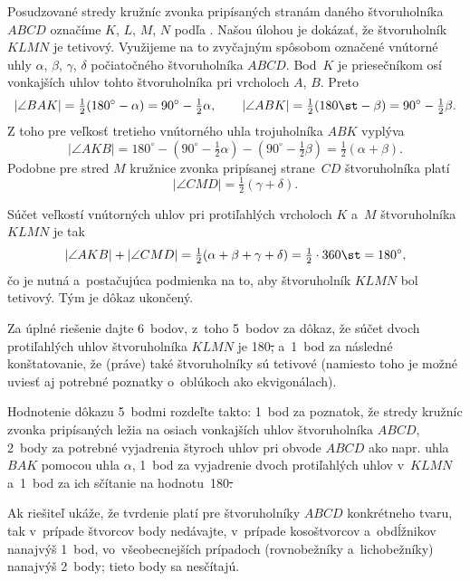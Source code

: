 {%
Posudzované stredy kružníc zvonka
%
pripísaných stranám daného štvoruholníka
$ABCD$ označíme $K$, $L$, $M$, $N$ podľa \obr. Našou úlohou je
dokázať, že štvoruholník $KLMN$ je tetivový. Využijeme na to zvyčajným spôsobom
označené vnútorné uhly $\alpha$, $\beta$, $\gamma$, $\delta$ počiatočného
štvoruholníka $ABCD$.
Bod~$K$ je priesečníkom osí vonkajších uhlov tohto štvoruholníka pri
vrcholoch $A$, $B$. Preto
$$
|\angle BAK|=\tfrac12(180^\circ-\alpha)=90^\circ-\tfrac12\alpha,\qquad
|\angle ABK|=\tfrac12(180\st-\beta)=90^\circ-\tfrac12\beta.
$$
Z toho pre veľkosť tretieho vnútorného uhla trojuholníka $ABK$ vyplýva
$$
|\angle AKB|=180^\circ-(90^\circ-\tfrac12\alpha)-
(90^\circ-\tfrac12\beta)=\tfrac12(\alpha+\beta).
$$
Podobne pre stred $M$ kružnice zvonka pripísanej strane~$CD$ štvoruholníka
platí
$$
|\angle CMD|=\tfrac12(\gamma+\delta).
$$

Súčet veľkostí vnútorných uhlov pri protiľahlých vrcholoch $K$ a~$M$
štvoruholníka $KLMN$ je tak
$$
|\angle AKB|+|\angle CMD|=\tfrac12(\alpha+\beta+\gamma+\delta)
=\tfrac12\cdot360\st=180^\circ,
$$
čo je nutná a~postačujúca podmienka na to, aby štvoruholník $KLMN$ bol
tetivový.
Tým je dôkaz ukončený.


\nobreak\medskip\petit\noindent
Za úplné riešenie dajte 6~bodov, z~toho 5~bodov za dôkaz, že súčet dvoch protiľahlých
uhlov štvoruholníka $KLMN$ je 180\st, a~1~bod za následné konštatovanie, že
(práve) také štvoruholníky sú tetivové (namiesto toho je možné uviesť
aj potrebné poznatky o~oblúkoch ako ekvigonálach).

Hodnotenie dôkazu 5~bodmi rozdeľte takto: 1~bod za poznatok, že stredy
kružníc zvonka pripísaných ležia na osiach vonkajších uhlov štvoruholníka $ABCD$,
2~body za potrebné vyjadrenia štyroch uhlov pri obvode $ABCD$ ako
napr. uhla $BAK$ pomocou uhla $\alpha$, 1~bod za vyjadrenie dvoch protiľahlých
uhlov v~$KLMN$ a~1~bod za ich sčítanie na hodnotu~180\st.

Ak riešiteľ ukáže, že tvrdenie platí pre štvoruholníky $ABCD$
konkrétneho tvaru, tak v~prípade štvorcov body nedávajte, v~prípade
kosoštvorcov a~obdĺžnikov nanajvýš 1~bod, vo~všeobecnejších prípadoch
(rovnobežníky a~lichobežníky) nanajvýš 2~body; tieto body sa nesčítajú.

\endpetit
}


